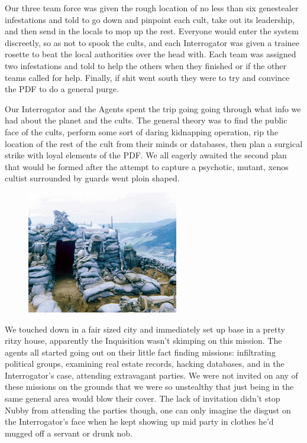 Our three team force was given the rough location of no less than six genestealer infestations and told to go down and pinpoint each cult, take out its leadership, and then send in the locals to mop up the rest. 
Everyone would enter the system discreetly, so as not to spook the cults, and each Interrogator was given a trainee rosette to beat the local authorities over the head with. 
Each team was assigned two infestations and told to help the others when they finished or if the other teams called for help. 
Finally, if shit went south they were to try and convince the PDF to do a general purge. %

Our Interrogator and the Agents spent the trip going going through what info we had about the planet and the cults. 
The general theory was to find the public face of the cults, perform some sort of daring kidnapping operation, rip the location of the rest of the cult from their minds or databases, then plan a surgical strike with loyal elements of the PDF. 
We all eagerly awaited the second plan that would be formed after the attempt to capture a psychotic, mutant, xenos cultist surrounded by guards went ploin shaped.

\begin{figure}
	\begin{center}
		\includegraphics[width=\figwidth]{pics/5/6.png}
	\end{center}
\end{figure}
We touched down in a fair sized city and immediately set up base in a pretty ritzy house, apparently the Inquisition wasn’t skimping on this mission. 
The agents all started going out on their little fact finding missions: 
infiltrating political groups, examining real estate records, hacking databases, and in the Interrogator’s case, attending extravagant parties. 
We were not invited on any of these missions on the grounds that we were so unstealthy that just being in the same general area would blow their cover. 
The lack of invitation didn’t stop Nubby from attending the parties though, one can only imagine the disgust on the Interrogator’s face when he kept showing up mid party in clothes he’d mugged off a servant or drunk nob.

